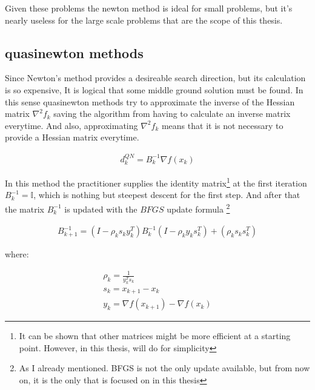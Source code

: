 Given these problems the newton method is ideal for small problems, but it's nearly useless for the large scale problems that are the scope of this thesis.

\subsection{quasinewton methods}

Since Newton's method provides a desireable search direction, but its calculation is so expensive, It is logical that some middle ground solution must be found.  In this sense quasinewton methods try to approximate the inverse of the Hessian matrix $\nabla^2 f_k$ saving the algorithm from having to calculate an inverse matrix everytime.  And also, approximating $\nabla^2 f_k$ means that it is not necessary to provide a Hessian matrix everytime.

\begin{equation}
  \begin{aligned}
    d_k^{QN} = B_k^{-1} \nabla f(x_k)
  \end{aligned}
\end{equation}

In this method the practitioner supplies the identity matrix\footnote{It can be shown that other matrices might be more efficient at a starting point.  However, in this thesis,  will do for simplicity} at the first iteration $B_k^{-1} = \mathbb{I}$, which is nothing but steepest descent for the first step.  And after that the matrix $B_k^{-1}$ is updated with the $BFGS$ update formula \footnote{As I already mentioned.  BFGS is not the only update available, but from now on, it is the only that is focused on in this thesis}

\begin{equation} \label{BFGSupdate}
  \begin{aligned}
    B_{k+1} ^{-1} = (I - \rho_k s_k y_k^T) B_k^{-1} (I - \rho_k y_k s_k^T) + (\rho_k s_k s_k^T)
  \end{aligned}
\end{equation} 

where:

\begin{equation*}
  \begin{aligned}
   \rho_k = \frac{1}{y_k^T s_k} \\
    s_k = x_{k+1} - x_k \\
    y_k = \nabla f(x_{k+1}) - \nabla f(x_k)
  \end{aligned}
\end{equation*} 

